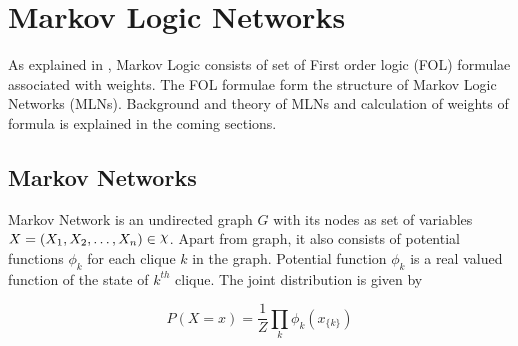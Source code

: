 \begin{comment}
\begin{table}[t,here]
\centering
\begin{tabular}{|l|c|}
\hline
\multicolumn{2}{|c|}{FRAME1} \\
\hline
 Car            &-0.181786\\
\hline
\multicolumn{1}{|c|}\vdots & \vdots \\
\hline
\multicolumn{1}{|c|}\vdots & \vdots \\
\hline
\multicolumn{2}{|c|}{FRAME151} \\
\hline
Person	&0.579786\\
\hline
Person	&-0.593087\\
\hline
\end{tabular}
\caption{Output of object detector with decision values}
\label{table:ObjDetection}
\end{table}
\end{comment}

\section{Markov Logic Networks}

\label{section_MLN}


As explained in \cite{MarkovLogic}, Markov Logic consists of set of First order
logic (FOL) formulae associated with weights. The FOL formulae form the structure 
of Markov Logic Networks (MLNs). Background and theory of MLNs and calculation of
weights of formula is explained in the coming sections.

\subsection{Markov Networks}
Markov Network is an undirected graph $G$ with its nodes as set of variables $X = (X_1, X_2,\ldots, X_n) \in \rchi $.
Apart from graph, it also consists of potential functions $\phi_k$ for each clique $k$ in the graph.
Potential function $\phi_k$ is a real valued function of the state of $k^{th}$ clique.
The joint distribution is given by

\begin{equation}
	\label{jointDist}
	P(X = x) = \frac{1}{Z}{\displaystyle \prod_{k} \phi_{k}(x_{\{k\}})}
\end{equation}

